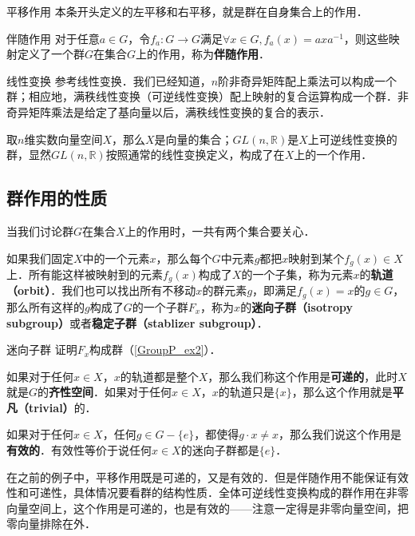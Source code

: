 \begin{example}{平移作用}\label{Group3_ex1}
本条开头定义的左平移和右平移，就是群在自身集合上的作用．
\end{example}

\begin{example}{伴随作用}\label{Group3_ex2}
对于任意$a\in G$，令$f_a: G\rightarrow G$满足$\forall x\in G, f_a(x)=axa^{-1}$，则这些映射定义了一个群$G$在集合$G$上的作用，称为\textbf{伴随作用}．
\end{example}

\begin{example}{线性变换}\label{Group3_ex3}
参考线性变换．我们已经知道，$n$阶非奇异矩阵配上乘法可以构成一个群；相应地，满秩线性变换（可逆线性变换）配上映射的复合运算构成一个群．非奇异矩阵乘法是给定了基向量以后，满秩线性变换的复合的表示．

取$n$维实数向量空间$X$，那么$X$是向量的集合；$GL(n,\mathbb{R})$是$X$上可逆线性变换的群，显然$GL(n,\mathbb{R})$按照通常的线性变换定义，构成了在$X$上的一个作用．
\end{example}

\subsection{群作用的性质}

当我们讨论群$G$在集合$X$上的作用时，一共有两个集合要关心．

如果我们固定$X$中的一个元素$x$，那么每个$G$中元素$g$都把$x$映射到某个$f_g(x)\in X$上．所有能这样被映射到的元素$f_g(x)$构成了$X$的一个子集，称为元素$x$的\textbf{轨道（orbit）}．我们也可以找出所有不移动$x$的群元素$g$，即满足$f_g(x)=x$的$g\in G$，那么所有这样的$g$构成了$G$的一个子群$F_x$，称为$x$的\textbf{迷向子群（isotropy subgroup）}或者\textbf{稳定子群（stablizer subgroup）}．

\begin{exercise}{迷向子群}\label{Group3_exe1}
证明$F_x$构成群（\autoref{GroupP_ex2}）．
\end{exercise}

如果对于任何$x\in X$，$x$的轨道都是整个$X$，那么我们称这个作用是\textbf{可递的}，此时$X$就是$G$的\textbf{齐性空间}．如果对于任何$x\in X$，$x$的轨道只是$\{x\}$，那么这个作用就是\textbf{平凡（trivial）}的．

如果对于任何$x\in X$，任何$g\in G-\{e\}$，都使得$g\cdot x\not=x$，那么我们说这个作用是\textbf{有效的}．有效性等价于说任何$x\in X$的迷向子群都是$\{e\}$．

在之前的例子中，平移作用既是可递的，又是有效的．但是伴随作用不能保证有效性和可递性，具体情况要看群的结构性质．全体可逆线性变换构成的群作用在非零向量空间上，这个作用是可递的，也是有效的——注意一定得是非零向量空间，把零向量排除在外．


